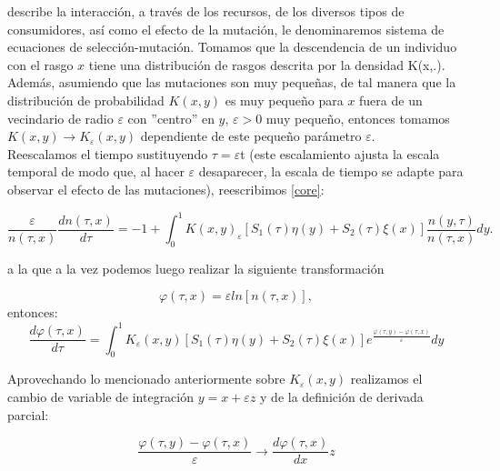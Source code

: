         \normalsize{describe la interacción, a través de los recursos, de los diversos tipos de consumidores, así como el efecto de la mutación, le denominaremos sistema de ecuaciones de selección-mutación. Tomamos que la descendencia de un individuo con el rasgo $x$ tiene una distribución de rasgos descrita por la densidad K(x,.).}\\

        \normalsize{Adem\'as, asumiendo que las mutaciones son muy peque\~nas, de tal manera que la distribuci\'on de probabilidad $K(x,y)$ es muy peque\~no para $x$ fuera de un vecindario de radio $\varepsilon$ con ''centro'' en $y$, $\varepsilon>0$ muy peque\~no, entonces tomamos $K(x,y)\to K_{\varepsilon}(x,y)$ dependiente de este pequeño parámetro $\varepsilon$.\citep{dieckman2005}}\\

        \normalsize{Reescalamos el tiempo sustituyendo $\tau=\varepsilon$t (este escalamiento ajusta la escala temporal de modo que, al hacer $\varepsilon$ desaparecer, la escala de tiempo se adapte para observar el efecto de las mutaciones), reescribimos \eqref{core}:}

        \begin{equation}\label{nocon}
            \frac{\varepsilon}{n(\tau,x)}\frac{d n(\tau,x)}{d\tau}=-1+\int_{0}^{1}K(x,y)_{\varepsilon}[S_1(\tau)\eta(y)+S_2(\tau)\xi(x)]\frac{n(y,\tau)}{n(\tau,x)}dy.
        \end{equation}

        \normalsize{a la que a la vez podemos luego realizar la siguiente transformación}

        \begin{equation*}
            \varphi(\tau,x)=\varepsilon ln[n(\tau,x)],
        \end{equation*}
        \normalsize{entonces:}
        \begin{equation*}
            \frac{d\varphi(\tau,x) }{d\tau}=\int_{0}^{1}K_{\varepsilon}(x,y)[S_1(\tau)\eta(y)+S_2(\tau)\xi(x)]e^{\frac{\varphi(\tau,y)-\varphi(\tau,x)}{\varepsilon}}dy
        \end{equation*}

        \normalsize{Aprovechando lo mencionado anteriormente sobre $K_{\varepsilon}(x,y)$ realizamos el cambio de variable de integración $y=x+\varepsilon z$ y de la definici\'on de derivada parcial:}

        \begin{equation*}
            \frac{\varphi(\tau,y)-\varphi(\tau,x)}{\varepsilon} \to \frac{d\varphi(\tau,x) }{dx}z
        \end{equation*}

